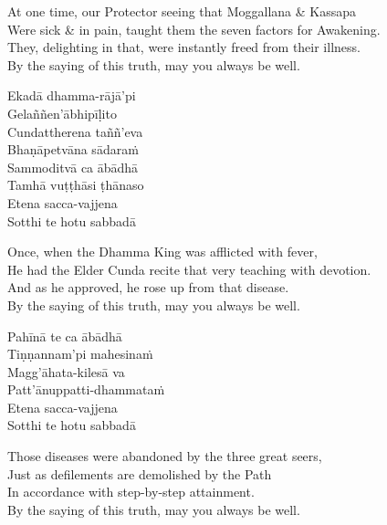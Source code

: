 \begin{english-verses}
  At one time, our Protector seeing that Moggallana \& Kassapa\\
  Were sick \& in pain, taught them the seven factors for Awakening.\\
  They, delighting in that, were instantly freed from their illness.\\
  By the saying of this truth, may you always be well.
\end{english-verses}

\begin{pali-hang-continued}
  Ekadā dhamma-rājā'pi\\
  Gelaññen'ābhipīḷito\\
  Cundattherena taññ'eva\\
  Bhaṇāpetvāna sādaraṁ\\
  Sammoditvā ca ābādhā\\
  Tamhā vuṭṭhāsi ṭhānaso\\
  Etena sacca-vajjena\\
  Sotthi te hotu sabbadā
\end{pali-hang-continued}

\begin{english-verses}
  Once, when the Dhamma King was afflicted with fever,\\
  He had the Elder Cunda recite that very teaching with devotion.\\
  And as he approved, he rose up from that disease.\\
  By the saying of this truth, may you always be well.
\end{english-verses}

\begin{pali-hang-continued}
  Pahīnā te ca ābādhā\\
  Tiṇṇannam'pi mahesinaṁ\\
  Magg'āhata-kilesā va\\
  Patt'ānuppatti-dhammataṁ\\
  Etena sacca-vajjena\\
  Sotthi te hotu sabbadā
\end{pali-hang-continued}

\begin{english-verses}
  Those diseases were abandoned by the three great seers,\\
  Just as defilements are demolished by the Path\\
  In accordance with step-by-step attainment.\\
  By the saying of this truth, may you always be well.
\end{english-verses}

